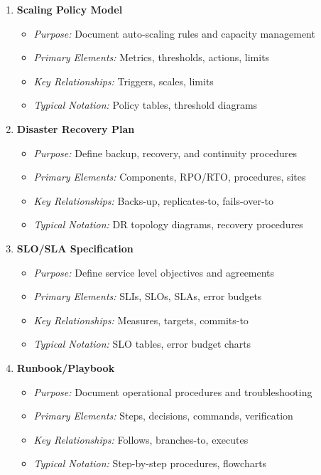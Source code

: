\documentclass[11pt,letterpaper]{article}
\begin{document}
\begin{enumerate}[label=\textbf{MT\arabic*:}, leftmargin=2.5em]
    \item \textbf{Scaling Policy Model}
    \begin{itemize}[nosep]
        \item \textit{Purpose:} Document auto-scaling rules and capacity management
        \item \textit{Primary Elements:} Metrics, thresholds, actions, limits
        \item \textit{Key Relationships:} Triggers, scales, limits
        \item \textit{Typical Notation:} Policy tables, threshold diagrams
    \end{itemize}
    
    \item \textbf{Disaster Recovery Plan}
    \begin{itemize}[nosep]
        \item \textit{Purpose:} Define backup, recovery, and continuity procedures
        \item \textit{Primary Elements:} Components, RPO/RTO, procedures, sites
        \item \textit{Key Relationships:} Backs-up, replicates-to, fails-over-to
        \item \textit{Typical Notation:} DR topology diagrams, recovery procedures
    \end{itemize}
    
    \item \textbf{SLO/SLA Specification}
    \begin{itemize}[nosep]
        \item \textit{Purpose:} Define service level objectives and agreements
        \item \textit{Primary Elements:} SLIs, SLOs, SLAs, error budgets
        \item \textit{Key Relationships:} Measures, targets, commits-to
        \item \textit{Typical Notation:} SLO tables, error budget charts
    \end{itemize}
    
    \item \textbf{Runbook/Playbook}
    \begin{itemize}[nosep]
        \item \textit{Purpose:} Document operational procedures and troubleshooting
        \item \textit{Primary Elements:} Steps, decisions, commands, verification
        \item \textit{Key Relationships:} Follows, branches-to, executes
        \item \textit{Typical Notation:} Step-by-step procedures, flowcharts
    \end{itemize}
    

\end{enumerate}
\end{document}
